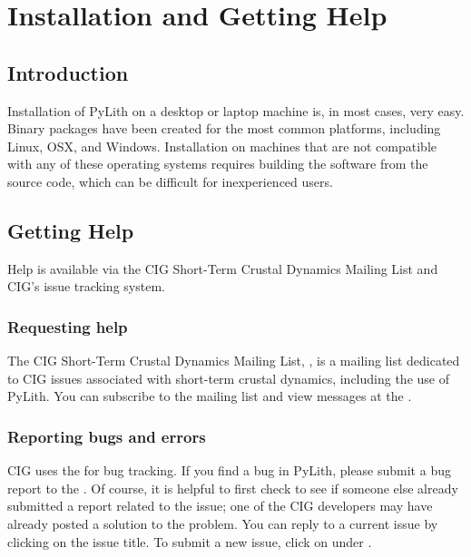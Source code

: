 \chapter{Installation and Getting Help}

\section{Introduction}

Installation of PyLith on a desktop or laptop machine is, in most
cases, very easy. Binary packages have been created for the most
common platforms, including Linux, OSX, and Windows. Installation on
machines that are not compatible with any of these operating systems
requires building the software from the source code, which can be
difficult for inexperienced users.

\section{Getting Help}

Help is available via the CIG Short-Term Crustal Dynamics Mailing List
and CIG's issue tracking system.

\subsection{Requesting help}

The CIG Short-Term Crustal Dynamics Mailing List,
, is a mailing list dedicated to CIG
issues associated with short-term crustal dynamics, including the use
of PyLith. You can subscribe to the mailing list and view messages at
the .

\subsection{Reporting bugs and errors}

CIG uses the  for bug tracking. If you find a bug
in PyLith, please submit a bug report to the . Of
course, it is helpful to first check to see if someone else already
submitted a report related to the issue; one of the CIG developers may
have already posted a solution to the problem. You can reply to a
current issue by clicking on the issue title. To submit a new issue,
click on  under .

